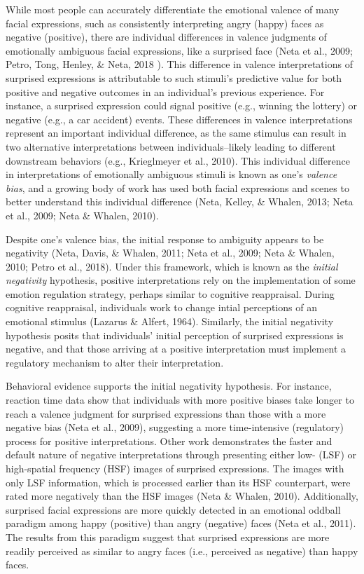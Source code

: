 \documentclass[man]{apa6}
\begin{document}
While most people can accurately differentiate the emotional valence of many facial expressions, such as consistently interpreting angry (happy) faces as negative (positive), there are individual differences in valence judgments of emotionally ambiguous facial expressions, like a surprised face (Neta et al., 2009; Petro, Tong, Henley, \& Neta, 2018 ). This difference in valence interpretations of surprised expressions is attributable to such stimuli's predictive value for both positive and negative outcomes in an individual's previous experience. For instance, a surprised expression could signal positive (e.g., winning the lottery) or negative (e.g., a car accident) events. These differences in valence interpretations represent an important individual difference, as the same stimulus can result in two alternative interpretations between individuals--likely leading to different downstream behaviors (e.g., Krieglmeyer et al., 2010). This individual difference in interpretations of emotionally ambiguous stimuli is known as one's \emph{valence bias}, and a growing body of work has used both facial expressions and scenes to better understand this individual difference (Neta, Kelley, \& Whalen, 2013; Neta et al., 2009; Neta \& Whalen, 2010).

Despite one's valence bias, the initial response to ambiguity appears to be negativity (Neta, Davis, \& Whalen, 2011; Neta et al., 2009; Neta \& Whalen, 2010; Petro et al., 2018). Under this framework, which is known as the \emph{initial negativity} hypothesis, positive interpretations rely on the implementation of some emotion regulation strategy, perhaps similar to cognitive reappraisal. During cognitive reappraisal, individuals work to change intial perceptions of an emotional stimulus (Lazarus \& Alfert, 1964). Similarly, the initial negativity hypothesis posits that individuals' initial perception of surprised expressions is negative, and that those arriving at a positive interpretation must implement a regulatory mechanism to alter their interpretation.

Behavioral evidence supports the initial negativity hypothesis. For instance, reaction time data show that individuals with more positive biases take longer to reach a valence judgment for surprised expressions than those with a more negative bias (Neta et al., 2009), suggesting a more time-intensive (regulatory) process for positive interpretations. Other work demonstrates the faster and default nature of negative interpretations through presenting either low- (LSF) or high-spatial frequency (HSF) images of surprised expressions. The images with only LSF information, which is processed earlier than its HSF counterpart, were rated more negatively than the HSF images (Neta \& Whalen, 2010). Additionally, surprised facial expressions are more quickly detected in an emotional oddball paradigm among happy (positive) than angry (negative) faces (Neta et al., 2011). The results from this paradigm suggest that surprised expressions are more readily perceived as similar to angry faces (i.e., perceived as negative) than happy faces.
\end{document}

